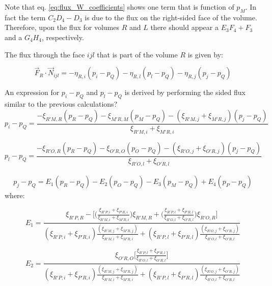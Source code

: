 \documentclass{article}
\begin{document}
Note that eq. \ref{eq:flux_W_coefficients} shows one term that is function of $ p_{M} $. In fact the term $ C_{2}D_{4} - D_{3}$ is due to the flux on the right-sided face of the volume. Therefore, upon the flux for volumes $ R $ and $ L $ there should appear a $ E_{3}F_{4} + F_{3} $ and a $ G_{4}H_{4} $, respectively.

The flux through the face $ ijl $ that is part of the volume $ R $ is given by:

\begin{equation} \label{eq:flux_volume_R_with_eta}
\vec{F}_{R} \cdot \vec{N}_{ijl} = - \eta_{R,i}(p_{i} - p_{Q}) - \eta_{R,l}(p_{l} - p_{Q}) - \eta_{R,j}(p_{j} - p_{Q})
\end{equation}

An expression for $ p_{i} - p_{Q} $ and $ p_{l} - p_{Q} $ is derived by performing the sided flux similar to the previous calculations?
\begin{equation}  \label{eq:pi_minus_pq_R}
p_{i} - p_{Q} = \frac{-\xi_{R'M,R}(p_{R}-p_{Q})-\xi_{M'R,M}(p_{M}-p_{Q}) -(\xi_{R'M,j}+\xi_{M'R,j})(p_{j}-p_{Q})}{\xi_{R'M,i}+\xi_{M'R,i}}
\end{equation}

\begin{equation}  \label{eq:pl_minus_pq_R}
p_{l} - p_{Q} = \frac{-\xi_{R'O,R}(p_{R}-p_{Q})-\xi_{O'R,O}(p_{O}-p_{Q}) -(\xi_{R'O,j}+\xi_{O'R,j})(p_{j}-p_{Q})}{\xi_{R'O,l}+\xi_{O'R,l}}
\end{equation}

\begin{equation} \label{eq:pj_minus_pq_R}
\begin{split}
p_{j}-p_{Q} = E_{1}(p_{R}-p_{Q}) - E_{2}(p_{O} - p_{Q}) - E_{3}(p_{M}-p_{Q})+E_{4}(p_{P}-p_{Q})
\end{split}
\end{equation}
where:

\begin{displaymath}
E_{1} =  \frac{\xi_{R'P,R} - \Bigg[\Bigg(\frac{\xi_{R'P,i}+\xi_{P'R,i}}{\xi_{R'M,i}+\xi_{M'R,i}}\Bigg)\xi_{R'M,R}+\Bigg(\frac{\xi_{R'P,l}+\xi_{P'R,l}}{\xi_{R'O,l}+\xi_{O'R,l}}\Bigg)\xi_{R'O,R}\Bigg]}{(\xi_{R'P,i}+\xi_{P'R,i})\frac{(\xi_{R'M,j}+\xi_{M'R,j})}{\xi_{R'M,i}+\xi_{M'R,i}}
+(\xi_{R'P,l}+\xi_{P'R,l})\frac{(\xi_{R'O,j}+\xi_{O'R,j})}{\xi_{R'O,l}+\xi_{O'R,l}}}
\end{displaymath}

\begin{displaymath}
E_{2} = \frac{\xi_{O'R,O}\Bigg[\frac{\xi_{R'P,l}+\xi_{P'R,l}}{\xi_{R'O,l}+\xi_{O'R,l}}\Bigg]}{(\xi_{R'P,i}+\xi_{P'R,i})\frac{(\xi_{R'M,j}+\xi_{M'R,j})}{\xi_{R'M,i}+\xi_{M'R,i}}
+(\xi_{R'P,l}+\xi_{P'R,l})\frac{(\xi_{R'O,j}+\xi_{O'R,j})}{\xi_{R'O,l}+\xi_{O'R,l}}}
\end{displaymath}
\end{document}
